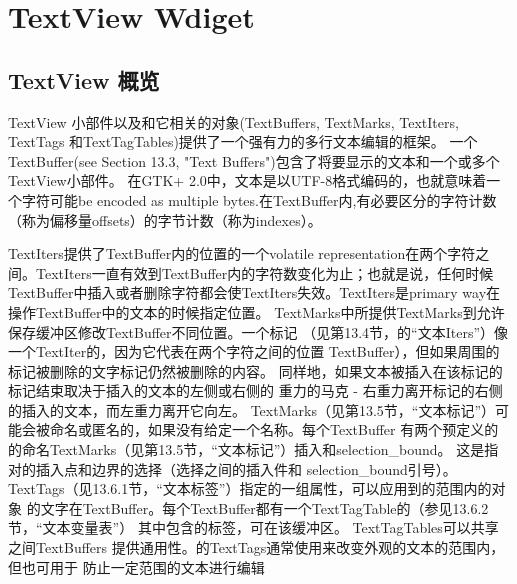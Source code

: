 \chapter{TextView Wdiget}
\section{TextView 概览}
TextView 小部件以及和它相关的对象(TextBuffers, TextMarks, TextIters, TextTags 和TextTagTables)提供了一个强有力的多行文本编辑的框架。
一个TextBuffer(see Section 13.3, "Text Buffers")包含了将要显示的文本和一个或多个TextView小部件。
在GTK+ 2.0中，文本是以UTF-8格式编码的，也就意味着一个字符可能be encoded as multiple bytes.在TextBuffer内,有必要区分的字符计数（称为偏移量offsets）的字节计数（称为indexes）。

TextIters提供了TextBuffer内的位置的一个volatile representation在两个字符之间。TextIters一直有效到TextBuffer内的字符数变化为止；也就是说，任何时候TextBuffer中插入或者删除字符都会使TextIters失效。TextIters是primary way在操作TextBuffer中的文本的时候指定位置。
TextMarks中所提供TextMarks到允许保存缓冲区修改TextBuffer不同位置。一个标记
（见第13.4节，的“文本Iters”）像一个TextIter的，因为它代表在两个字符之间的位置
TextBuffer），但如果周围的标记被删除的文字标记仍然被删除的内容。
同样地，如果文本被插入在该标记的标记结束取决于插入的文本的左侧或右侧的
重力的马克 - 右重力离开标记的右侧的插入的文本，而左重力离开它向左。
TextMarks（见第13.5节，“文本标记”）可能会被命名或匿名的，如果没有给定一个名称。每个TextBuffer
有两个预定义的的命名TextMarks（见第13.5节，“文本标记”）插入和selection_bound。
这是指对的插入点和边界的选择（选择之间的插入件和
selection_bound引号）。
TextTags（见13.6.1节，“文本标签”）指定的一组属性，可以应用到的范围内的对象
的文字在TextBuffer。每个TextBuffer都有一个TextTagTable的（参见13.6.2节，“文本变量表”）
其中包含的标签，可在该缓冲区。 TextTagTables可以共享之间TextBuffers
提供通用性。的TextTags通常使用来改变外观的文本的范围内，但也可用于
防止一定范围的文本进行编辑
